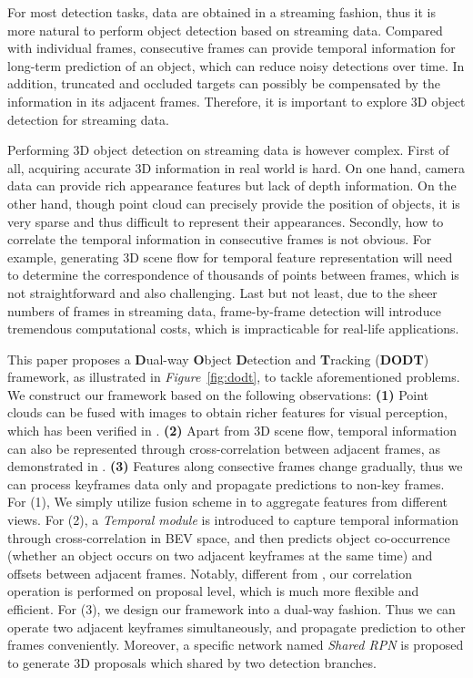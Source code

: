 \documentclass[letterpaper, 10pt, conference]{ieeeconf}  %
\def\figurename{\emph{Figure}}
\begin{document}
For most detection tasks, data are obtained in a streaming fashion, thus it is more natural to perform object detection based on streaming data. Compared with individual frames, consecutive frames can provide temporal information for long-term prediction of an object, which can reduce noisy detections over time. In addition, truncated and occluded targets can possibly be compensated by the information in its adjacent frames. Therefore, it is important to explore 3D object detection for streaming data.

Performing 3D object detection on streaming data is however complex. First of all, acquiring accurate 3D information in real world is hard. On one hand, camera data can provide rich appearance features but lack of depth information. On the other hand, though point cloud can precisely provide the position of objects, it is very sparse and thus difficult to represent their appearances. Secondly, how to correlate the temporal information in consecutive frames is not obvious. For example, generating 3D scene flow for temporal feature representation will need to determine the correspondence of thousands of points between frames, which is not straightforward and also challenging. Last but not least, due to the sheer numbers of frames in streaming data, frame-by-frame detection will introduce tremendous computational costs, which is impracticable for real-life applications. 

This paper proposes a \textbf{D}ual-way \textbf{O}bject \textbf{D}etection and \textbf{T}racking (\textbf{DODT}) framework, as illustrated in \figurename \, \ref{fig:dodt}, to tackle aforementioned problems. We construct our framework based on the following observations: \textbf{(1)} Point clouds can be fused with images to obtain richer features for visual perception, which has been verified in \cite{chen2017multi, ku2018joint}. \textbf{(2)} Apart from 3D scene flow, temporal information can also be represented through cross-correlation between adjacent frames, as demonstrated in \cite{feichtenhofer2017detect}. \textbf{(3)} Features along consective frames change gradually, thus we can process keyframes data only and propagate predictions to non-key frames. For (1), We simply utilize fusion scheme in \cite{ku2018joint} to aggregate features from different views. For (2), a \textit{Temporal module} is introduced to capture temporal information through cross-correlation in BEV space, and then predicts object co-occurrence (whether an object occurs on two adjacent keyframes at the same time) and offsets between adjacent frames. Notably, different from \cite{feichtenhofer2017detect, dosovitskiy2015flownet},  our correlation operation is performed on proposal level, which is much more flexible and efficient. For (3), we design our framework into a dual-way fashion. Thus we can operate two adjacent keyframes simultaneously, and propagate prediction to other frames conveniently. Moreover, a specific network named \textit{Shared RPN} is proposed to generate 3D proposals which shared by two detection branches. 
\end{document}
